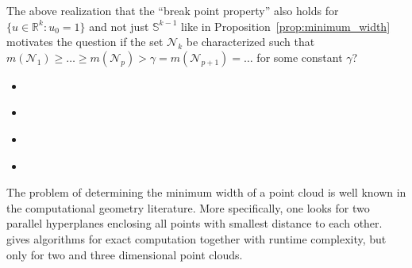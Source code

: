 The above realization that the \enquote{break point property} also holds for $\{u\in\mathbb{R}^k:u_0=1\}$ and not just $\mathbb{S}^{k-1}$ like in Proposition~\ref{prop:minimum_width} motivates the question if the set $\mathcal{N}_k$ be characterized such that $m(\mathcal{N}_1)\ge\dots\ge m(\mathcal{N}_p)>\gamma=m(\mathcal{N}_{p+1})=\dots$ for some constant $\gamma$?


\begin{itemize}
    \item \cite{10.1145/1008731.1008736}
    \item \cite{gritzmann_computational_1993}
    \item \cite{ahn_minimum-width_2025}
    \item \cite{ahn_k_2025}
\end{itemize}

The problem of determining the minimum width of a point cloud is well known in the computational geometry literature. More specifically, one looks for two parallel hyperplanes enclosing all points with smallest distance to each other. \cite{10.1145/323233.323234} gives algorithms for exact computation together with runtime complexity, but only for two and three dimensional point clouds.
